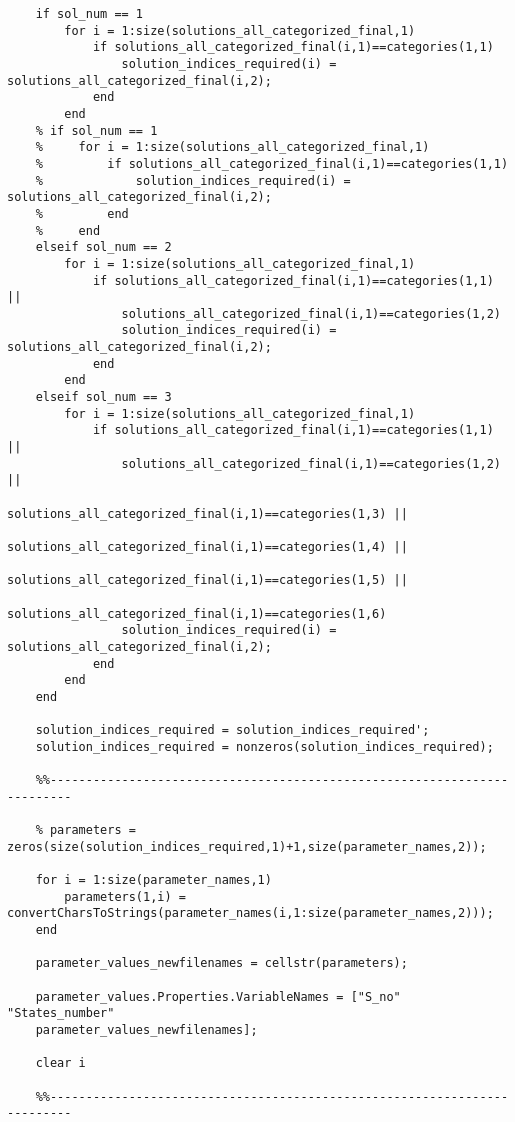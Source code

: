 \documentclass{article}
\begin{document}
\begin{verbatim}
    if sol_num == 1
        for i = 1:size(solutions_all_categorized_final,1)
            if solutions_all_categorized_final(i,1)==categories(1,1) 
                solution_indices_required(i) = solutions_all_categorized_final(i,2);
            end
        end
    % if sol_num == 1
    %     for i = 1:size(solutions_all_categorized_final,1)
    %         if solutions_all_categorized_final(i,1)==categories(1,1)
    %             solution_indices_required(i) = solutions_all_categorized_final(i,2);
    %         end
    %     end
    elseif sol_num == 2
        for i = 1:size(solutions_all_categorized_final,1)
            if solutions_all_categorized_final(i,1)==categories(1,1) || 
                solutions_all_categorized_final(i,1)==categories(1,2)
                solution_indices_required(i) = solutions_all_categorized_final(i,2);
            end
        end
    elseif sol_num == 3
        for i = 1:size(solutions_all_categorized_final,1)
            if solutions_all_categorized_final(i,1)==categories(1,1) || 
                solutions_all_categorized_final(i,1)==categories(1,2) || 
                    solutions_all_categorized_final(i,1)==categories(1,3) || 
                        solutions_all_categorized_final(i,1)==categories(1,4) || 
                            solutions_all_categorized_final(i,1)==categories(1,5) || 
                                solutions_all_categorized_final(i,1)==categories(1,6)
                solution_indices_required(i) = solutions_all_categorized_final(i,2);
            end
        end
    end
    
    solution_indices_required = solution_indices_required';
    solution_indices_required = nonzeros(solution_indices_required);
    
    %%-------------------------------------------------------------------------
    
    % parameters = zeros(size(solution_indices_required,1)+1,size(parameter_names,2));
    
    for i = 1:size(parameter_names,1)
        parameters(1,i) = convertCharsToStrings(parameter_names(i,1:size(parameter_names,2)));
    end
    
    parameter_values_newfilenames = cellstr(parameters);
    
    parameter_values.Properties.VariableNames = ["S_no" "States_number" 
    parameter_values_newfilenames];
    
    clear i
    
    %%-------------------------------------------------------------------------
    

\end{verbatim}
\end{document}
